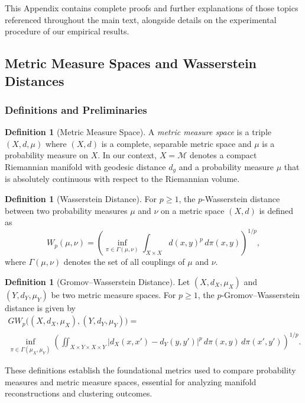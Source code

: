 \documentclass{article}
\theoremstyle{plain}
\theoremstyle{definition}
\newtheorem{definition}[theorem]{Definition}
\theoremstyle{remark}
\begin{document}
This Appendix contains complete proofs and further explanations of those topics referenced throughout the main text, alongside details on the experimental procedure of our empirical results.

\subsection{Metric Measure Spaces and Wasserstein Distances}
\label{app:metric-measure-wasserstein}

\subsubsection{Definitions and Preliminaries}

\begin{definition}[Metric Measure Space]
A \emph{metric measure space} is a triple $(X, d, \mu)$ where $(X, d)$ is a complete, separable metric space and $\mu$ is a probability measure on $X$. In our context, $X = \mathcal{M}$ denotes a compact Riemannian manifold with geodesic distance $d_g$ and a probability measure $\mu$ that is absolutely continuous with respect to the Riemannian volume.
\end{definition}

\begin{definition}[Wasserstein Distance]
For $p \geq 1$, the $p$-Wasserstein distance between two probability measures $\mu$ and $\nu$ on a metric space $(X, d)$ is defined as
$$
W_p(\mu, \nu) = \left( \inf_{\pi \in \Gamma(\mu, \nu)} \int_{X \times X} d(x, y)^p \, d\pi(x, y) \right)^{1/p},
$$
where $\Gamma(\mu, \nu)$ denotes the set of all couplings of $\mu$ and $\nu$.
\end{definition}

\begin{definition}[Gromov--Wasserstein Distance]
Let $(X, d_X, \mu_X)$ and $(Y, d_Y, \mu_Y)$ be two metric measure spaces. For $p \geq 1$, the $p$-Gromov--Wasserstein distance is given by
\begin{multline*}
    GW_p\big((X, d_X, \mu_X), (Y, d_Y, \mu_Y)\big) = \\ \inf_{\pi \in \Gamma(\mu_X, \mu_Y)} \left( \iint_{X \times Y \times X \times Y} |d_X(x, x') - d_Y(y, y')|^p \, d\pi(x, y) \, d\pi(x', y') \right)^{1/p}.
\end{multline*}
\end{definition}

These definitions establish the foundational metrics used to compare probability measures and metric measure spaces, essential for analyzing manifold reconstructions and clustering outcomes.
\end{document}
